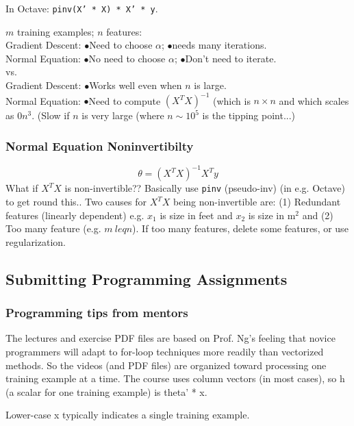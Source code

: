 \documentclass[11pt,a4paper]{article}
\begin{document}
    In Octave: {\tt pinv(X' * X) * X' * y}. 
    
    \noindent
    $m$ training examples; $n$ features: \\
    Gradient Descent: $\bullet$Need to choose $\alpha$; $\bullet$needs many iterations. \\
    Normal Equation: $\bullet$No need to choose $\alpha$; $\bullet$Don't need to iterate. \\
    vs. \\
    Gradient Descent: $\bullet$Works well even when $n$ is large.\\
    Normal Equation: $\bullet$Need to  compute $(X^{T} X)^{-1}$ (which is $n \times n$ and 
    which scales as $\mathcal{0} n^3$.  (Slow if $n$ is very large (where $n\sim10^5$ is the tipping point...)

    \subsubsection{Normal Equation Noninvertibilty}
    \begin{equation}
      \theta = (X^{T} X)^{-1} X^{T} y
    \end{equation}
    What if  $X^{T} X$ is non-invertible??
    Basically use {\tt pinv} (pseudo-inv) (in e.g. Octave) to get round this..
    Two causes for $X^{T} X$ being non-invertible are: (1) Redundant
    features (linearly dependent) e.g. $x_{1}$ is size in feet and $x_{2}$ is
    size in m$^2$ and (2) Too many feature (e.g. $m\ leq n$). 
    If too many features, delete some features, or use regularization.
    

    \subsection{Submitting Programming Assignments}
    \subsubsection{Programming tips from mentors}
    The lectures and exercise PDF files are based on Prof. Ng's
    feeling that novice programmers will adapt to for-loop techniques more
    readily than vectorized methods. So the videos (and PDF files) are
    organized toward processing one training example at a time. The course
    uses column vectors (in most cases), so h (a scalar for one training
    example) is theta' * x.
    
    Lower-case x typically indicates a single training example.
    
\end{document}
